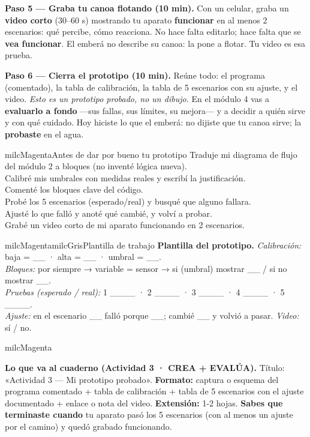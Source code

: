 \documentclass[11pt,letterpaper]{article}
\newcommand{\checkbox}{\textcolor{milcGradeDark}{\fbox{\phantom{x}}}\hspace{5pt}}
\newcommand{\milcpaso}[3]{%
\Needspace{4\baselineskip}%
\begin{tcolorbox}[enhanced,colback=white,colframe=milcLinea,arc=1.5mm,boxrule=.9pt,
  left=14mm,right=4mm,top=3mm,bottom=3mm,before skip=4pt,after skip=4pt,
  fontupper=\RaggedRight,
  overlay={\node[anchor=north west,circle,fill=#2,text=white,inner sep=0pt,
    minimum size=7.4mm,font=\sffamily\bfseries\small]
    at ([xshift=3.6mm,yshift=-3.2mm]frame.north west) {#1};}]
#3
\end{tcolorbox}}
\begin{document}
\milcpaso{5}{milcMagenta}{\textbf{Paso 5 --- Graba tu canoa flotando (10 min).} Con un celular, graba un \textbf{video corto} (30--60 s) mostrando tu aparato \textbf{funcionar} en al menos 2 escenarios: qué percibe, cómo reacciona. No hace falta editarlo; hace falta que se \textbf{vea funcionar}. El emberá no describe su canoa: la pone a flotar. Tu video es esa prueba.}
\milcpaso{6}{milcMagenta}{\textbf{Paso 6 --- Cierra el prototipo (10 min).} Reúne todo: el programa (comentado), la tabla de calibración, la tabla de 5 escenarios con su ajuste, y el video. \emph{Esto es un prototipo probado, no un dibujo.} En el módulo 4 vas a \textbf{evaluarlo a fondo} ---sus fallas, sus límites, su mejora--- y a decidir a quién sirve y con qué cuidado. Hoy hiciste lo que el emberá: no dijiste que tu canoa sirve; la \textbf{probaste} en el agua.}

\begin{drawbox}{milcMagenta}{Antes de dar por bueno tu prototipo}
\checkbox Traduje mi diagrama de flujo del módulo 2 a bloques (no inventé lógica nueva). \\[1mm]
\checkbox Calibré mis umbrales con medidas reales y escribí la justificación. \\[1mm]
\checkbox Comenté los bloques clave del código. \\[1mm]
\checkbox Probé los 5 escenarios (esperado/real) y busqué que alguno fallara. \\[1mm]
\checkbox Ajusté lo que falló y anoté qué cambié, y volví a probar. \\[1mm]
\checkbox Grabé un video corto de mi aparato funcionando en 2 escenarios.
\end{drawbox}

\begin{softbox}{milcMagenta}{milcGris}{Plantilla de trabajo}
\textbf{Plantilla del prototipo.} \textit{Calibración:} baja = \_\_ · alta = \_\_ · umbral = \_\_. \\[1mm]
\textit{Bloques:} por siempre → variable = sensor → si (umbral) mostrar \_\_ / si no mostrar \_\_. \\[1mm]
\textit{Pruebas (esperado / real):} 1 \_\_\_\_ · 2 \_\_\_\_ · 3 \_\_\_\_ · 4 \_\_\_\_ · 5 \_\_\_\_. \\[1mm]
\textit{Ajuste:} en el escenario \_\_ falló porque \_\_; cambié \_\_ y volvió a pasar. \quad \textit{Video:} sí / no.
\end{softbox}

\begin{infoband}{milcMagenta}


\textbf{Lo que va al cuaderno (Actividad 3 · CREA + EVALÚA).} Título: «Actividad 3 --- Mi prototipo probado». \textbf{Formato:} captura o esquema del programa comentado + tabla de calibración + tabla de 5 escenarios con el ajuste documentado + enlace o nota del video. \textbf{Extensión:} 1-2 hojas. \textbf{Sabes que terminaste cuando} tu aparato pasó los 5 escenarios (con al menos un ajuste por el camino) y quedó grabado funcionando.
\end{infoband}
\end{document}
